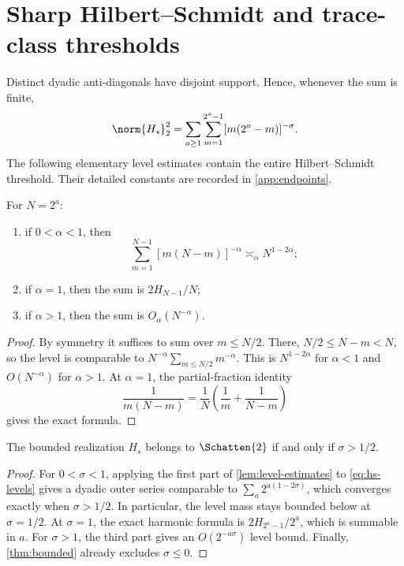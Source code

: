\section{Sharp Hilbert--Schmidt and trace-class thresholds}
\label{sec:ideals}

Distinct dyadic anti-diagonals have disjoint support.  Hence, whenever the
sum is finite,
\begin{equation}
  \norm{H_s}_2^2
  =\sum_{a\ge1}\sum_{m=1}^{2^a-1}
     [m(2^a-m)]^{-\sigma}.
  \label{eq:hs-levels}
\end{equation}
The following elementary level estimates contain the entire
Hilbert--Schmidt threshold.  Their detailed constants are recorded in
\cref{app:endpoints}.

\begin{lemma}
\label{lem:level-estimates}
For $N=2^a$:
\begin{enumerate}
  \item if $0<\alpha<1$, then
  \[
    \sum_{m=1}^{N-1}[m(N-m)]^{-\alpha}
    \asymp_\alpha N^{1-2\alpha};
  \]
  \item if $\alpha=1$, then the sum is $2H_{N-1}/N$;
  \item if $\alpha>1$, then the sum is $O_\alpha(N^{-\alpha})$.
\end{enumerate}
\end{lemma}

\begin{proof}
By symmetry it suffices to sum over $m\le N/2$.  There,
$N/2\le N-m<N$, so the level is comparable to
$N^{-\alpha}\sum_{m\le N/2}m^{-\alpha}$.  This is
$N^{1-2\alpha}$ for $\alpha<1$ and $O(N^{-\alpha})$ for $\alpha>1$.
At $\alpha=1$, the partial-fraction identity
\[
  \frac1{m(N-m)}=\frac1N(\frac1m+\frac1{N-m})
\]
gives the exact formula.
\end{proof}

\begin{theorem}
\label{thm:hs}
The bounded realization $H_s$ belongs to $\Schatten{2}$ if and only if
$\sigma>1/2$.
\end{theorem}

\begin{proof}
For $0<\sigma<1$, applying the first part of
\cref{lem:level-estimates} to \cref{eq:hs-levels} gives a dyadic outer
series comparable to
$\sum_a2^{a(1-2\sigma)}$, which converges exactly when
$\sigma>1/2$.  In particular, the level mass stays bounded below at
$\sigma=1/2$.  At $\sigma=1$, the exact harmonic formula is
$2H_{2^a-1}/2^a$, which is summable in $a$.  For $\sigma>1$, the third
part gives an $O(2^{-a\sigma})$ level bound.  Finally,
\cref{thm:bounded} already excludes $\sigma\le0$.
\end{proof}

